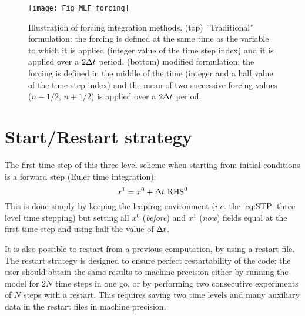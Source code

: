 \documentclass[../tex_main/NEMO_manual]{subfiles}
\begin{document}
\begin{figure}[!t]
  \begin{center}
    \texttt{[image: Fig\_MLF\_forcing]}
    \caption{ 	\protect\label{fig:MLF_forcing}
      Illustration of forcing integration methods.
      (top) ''Traditional'' formulation:
      the forcing is defined at the same time as the variable to which it is applied
      (integer value of the time step index) and it is applied over a $2\Delta t$ period.
      (bottom)  modified formulation:
      the forcing is defined in the middle of the time (integer and a half value of the time step index) and
      the mean of two successive forcing values ($n-1/2$, $n+1/2$) is applied over a $2\Delta t$ period.
    }
  \end{center}
\end{figure}

\section{Start/Restart strategy}
\label{sec:STP_rst}


The first time step of this three level scheme when starting from initial conditions is a forward step
(Euler time integration):
\begin{equation} \label{eq:DOM_euler}
	x^1 = x^0 + \Delta t \ \text{RHS}^0
\end{equation}
This is done simply by keeping the leapfrog environment ($i.e.$ the \autoref{eq:STP} three level time stepping) but
setting all $x^0$ (\textit{before}) and $x^{1}$ (\textit{now}) fields equal at the first time step and
using half the value of $\Delta t$.

It is also possible to restart from a previous computation, by using a restart file.
The restart strategy is designed to ensure perfect restartability of the code:
the user should obtain the same results to machine precision either by
running the model for $2N$ time steps in one go,
or by performing two consecutive experiments of $N$ steps with a restart.
This requires saving two time levels and many auxiliary data in the restart files in machine precision. 
\end{document}
